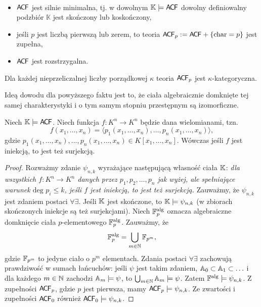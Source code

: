 \documentclass{article}
\begin{document}
\begin{wnn}
	~\begin{itemize}
		\item $\mathsf{A \mkern-2.0mu C \mkern-1.1mu F}$ jest silnie minimalna, tj. w dowolnym $\mathbb{K} \models \mathsf{A \mkern-2.0mu C \mkern-1.1mu F}$ dowolny definiowalny podzbiór $\mathbb{K}$ jest skończony lub koskończony,
		\item jeśli $p$ jest liczbą pierwszą lub zerem, to teoria $\mathsf{A \mkern-2.0mu C \mkern-1.1mu F}_p := \mathsf{A \mkern-2.0mu C \mkern-1.1mu F} +  \{\text{char} = p\}$ jest zupełna,
		\item $\mathsf{A \mkern-2.0mu C \mkern-1.1mu F}$ jest rozstrzygalna.
	\end{itemize}
\end{wnn}

\begin{fakt}
	Dla każdej nieprzeliczalnej liczby porządkowej $\kappa$ teoria $\mathsf{A \mkern-2.0mu C \mkern-1.1mu F}_p$ jest $\kappa$-kategoryczna.
\end{fakt}
Ideą dowodu dla powyższego faktu jest to, że ciała algebraicznie domknięte tej samej charakterystyki i o tym samym stopniu przestępnym są izomorficzne.

\begin{tw}[Ax--Grothendick]
	Niech $\mathbb{K} \models \mathsf{A \mkern-2.0mu C \mkern-1.1mu F}$.
	Niech funkcja $f \colon K^n \rightarrow K^n$ będzie dana wielomianami, tzn. $$f(x_1, \ldots, x_n) = \langle p_1(x_1, \ldots, x_n), \ldots, p_n(x_1, \ldots, x_n)\rangle ,$$ gdzie $p_1(x_1, \ldots, x_n), \ldots, p_n(x_1, \ldots, x_n) \in K[x_1, \ldots, x_n]$. %
	Wówczas jeśli $f$ jest iniekcją, to jest też surjekcją.
\end{tw}
\begin{proof}
	Rozważmy zdanie $\psi_{n,k}$ wyrażające następującą własność ciała $\mathbb{K}$: 
	\textit{dla wszystkich $f \colon K^n \rightarrow K^n$ danych przez $p_1, p_2, \ldots, p_n$ jak wyżej, ale spełniające warunek $\text{deg } p_i \leq k$, jeśli $f$ jest iniekcją, to jest też surjekcją. }
	Zauważmy, że $\psi_{n,k}$ jest zdaniem postaci $\forall \exists$.
	Jeśli $\mathbb{K}$ jest skończone, to $\mathbb{K} \models \psi_{n,k}$ (w zbiorach skończonych iniekcje są też surjekcjami). %
	Niech $\mathbb{F}^{\text{alg}}_{p}$ oznacza algebraiczne domknięcie ciała $p$-elementowego $\mathbb{F}^{\text{alg}}_p$.
	Zauważmy, że $$\mathbb{F}^{\text{alg}}_{p} = \bigcup_{m \in \mathbb{N}} \mathbb{F}_{p^m},$$ gdzie $\mathbb{F}_{p^m}$ to jedyne ciało o $p^m$ elementach.
	Zdania postaci $\forall \exists$ zachowują prawdziwość w sumach łańcuchów:
	jeśli $\psi$ jest takim zdaniem, $\mathbb{A}_0 \subset \mathbb{A}_1 \subset \ldots $ i dla każdego $m \in \mathbb{N}$ zachodzi $\mathbb{A}_m \models \psi$, to $\bigcup_{m \in \mathbb{N}} \mathbb{A}_m \models \psi$. 
	Zatem $\mathbb{F}^{\text{alg}} \models \psi_{n,k}$. %
	Z zupełności $\mathsf{A \mkern-2.0mu C \mkern-1.1mu F}_p$, gdzie $p$ jest pierwsza, mamy $\mathsf{A \mkern-2.0mu C \mkern-1.1mu F}_p \models \psi_{n,k}$.
	Ze zwartości i zupełności $\mathsf{A \mkern-2.0mu C \mkern-1.1mu F}_0$ również $\mathsf{A \mkern-2.0mu C \mkern-1.1mu F}_0 \models \psi_{n,k}$.
	
\end{proof}
\end{document}

